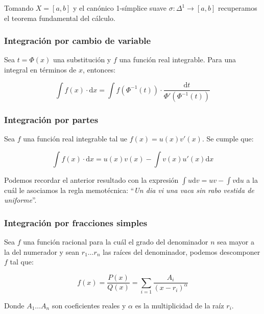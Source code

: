 \documentclass[10pt]{article}
\newcommand{\diff}{\mathrm{d}}
\begin{document}
Tomando $ X = [a, b] $ y el canónico 1-símplice suave $ \sigma : \Delta^1 \to [a, b] $ recuperamos el teorema fundamental del cálculo.

\subsubsection{Integración por cambio de variable}

\begin{theorem}
  Sea $ t = \Phi(x) $ una substitución y $ f $ una función real integrable. Para una integral en términos de $ x $, entonces:
  
  \[ \int f(x) \cdot \diff x = \int f(\Phi^{-1}(t)) \cdot \frac{\diff t}{\Phi'(\Phi^{-1}(t))}  \]
\end{theorem}

\subsubsection{Integración por partes}

\begin{theorem}
  Sea $ f $ una función real integrable tal ue $ f(x) = u(x) v'(x) $. Se cumple que:

  \[ \int f(x) \cdot \diff x = u(x) v(x) - \int v(x) u'(x) \diff x  \]
\end{theorem}

\begin{remark}
  Podemos recordar el anterior resultado con la expresión $ \int u \diff v = uv - \int v \diff u $ a la cuál le asociamos
  la regla memotécnica: ``\textit{Un dia vi una vaca sin rabo vestida de uniforme}''.
\end{remark}

\subsubsection{Integración por fracciones simples}

\begin{theorem}
  Sea $ f $ una función racional para la cuál el grado del denominador $ n $ sea mayor a la del numerador y sean
  $ r_1 \dots r_n $ las raíces del denominador, podemos descomponer $ f $
  tal que:

  \[ f(x) = \frac{P(x)}{Q(x)} = \sum_{i = 1} \frac{A_i}{(x - r_i)^\alpha }\]

  Donde $ A_1 \dots A_n $ son coeficientes reales y $ \alpha $ es la multiplicidad de la raíz $ r_i $.
\end{theorem}
\end{document}
